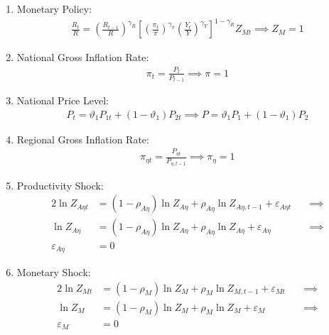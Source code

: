 \documentclass[
thesis.tex
]{subfiles}
\begin{document}
\begin{enumerate}
	\item Monetary Policy:
	\begin{align}
		\label{eq:reg-ss-monetary-policy}
		\frac{R_{t}}{R} =
		\left( \frac{R_{t-1}}{R} \right)^{\gamma_R}  \left[
		\left( \frac{\pi_t}{\pi} \right)^{\gamma_\pi}
		\left( \frac{Y_t}{Y} \right)^{\gamma_Y} \right]^{1-\gamma_R} Z_{Mt}
		\implies Z_{M} = 1
	\end{align}

	\item National Gross Inflation Rate:
	\begin{align}
		\pi_t = \frac{P_t}{P_{t-1}} \implies \pi = 1 \label{eq:reg-ss-gross-inflation-rate}
	\end{align}
	
	\item National Price Level:
	\begin{align}
		P_t = \vartheta_1 P_{1 t} + (1 -\vartheta_1) P_{2 t} \implies P = \vartheta_1 P_{1} + (1 -\vartheta_1) P_{2} \label{eq:ss-national-price-level}
	\end{align}
	
	\item Regional Gross Inflation Rate:
	\begin{align}
		\pi_{\eta t} = \frac{P_{\eta t}}{P_{\eta, t-1}} \implies \pi_{\eta} = 1 \label{eq:ss-regional-inflation}
	\end{align}

	\item Productivity Shock:
	\begin{alignat}{2}
		\ln{Z_{A\eta t}} &= (1 -\rho_{A\eta}) \ln{Z_{A\eta}} + \rho_{A\eta} \ln{Z_{A\eta,t-1}} + \varepsilon_{A\eta t} \quad &\implies \nonumber \\
		\ln{Z_{A\eta}} &= (1 -\rho_{A\eta}) \ln{Z_{A\eta}} + \rho_{A\eta} \ln{Z_{A\eta}} + \varepsilon_{A\eta} &\implies \nonumber \\
		\varepsilon_{A\eta} &= 0 \label{eq:reg-ss-productivity-shock}
	\end{alignat}
	
	\item Monetary Shock:
	\begin{alignat}{2}
		\ln{Z_{Mt}} &= (1-\rho_M)\ln{Z_{M}} + \rho_M\ln{Z_{M,t-1}} + \varepsilon_{Mt} \quad &\implies \nonumber \\
		\ln{Z_{M}} &= (1-\rho_M)\ln{Z_{M}} + \rho_M\ln{Z_{M}} + \varepsilon_{M} &\implies \nonumber \\
		\varepsilon_{M} &= 0 \label{eq:reg-ss-monetary-shock}
	\end{alignat}


\end{enumerate}
\end{document}
